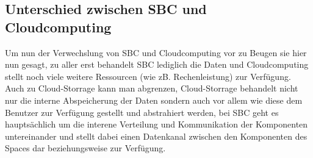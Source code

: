 \documentclass[a4paper,12pt]{scrreprt}
\begin{document}
%		
		
		
		\subsection{Unterschied zwischen SBC und Cloudcomputing}
			Um nun der Verwechslung von SBC und Cloudcomputing vor zu Beugen sie hier nun gesagt, zu aller erst behandelt SBC lediglich die Daten und Cloudcomputing stellt noch viele weitere Ressourcen (wie zB. Rechenleistung) zur Verfügung. Auch zu Cloud-Storrage kann man abgrenzen, Cloud-Storrage behandelt nicht nur die interne Abspeicherung der Daten sondern auch vor allem wie diese dem Benutzer zur Verfügung gestellt und abstrahiert werden, bei SBC geht es hauptsächlich um die interene Verteilung und Kommunikation der Komponenten untereinander und stellt dabei einen Datenkanal zwischen den Komponenten des Spaces dar beziehungsweise zur Verfügung. 
			
\end{document}
